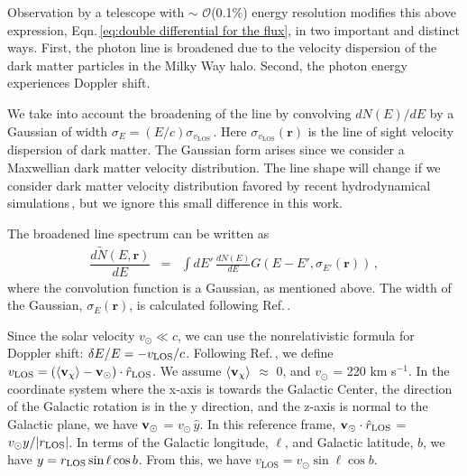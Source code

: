 \documentclass[aps,prd,10pt,twocolumn,superscriptaddress,showpacs,footinbib]{revtex4-1}
\newcommand{\br}[0]{\mathbf{r}}
\newcommand{\los}[0]{\mathrm{LOS}}
\begin{document}
Observation by a telescope with $\sim$ $\mathcal{O}$(0.1\%) energy resolution modifies this above expression, Eqn.\,\ref{eq:double differential for the flux}, in two important and distinct ways.  First, the photon line is broadened due to the velocity dispersion of the dark matter particles in the Milky Way halo.  Second, the photon energy experiences Doppler shift.  

We take into account the broadening of the line by convolving $dN(E)/dE$ by a Gaussian of width
$\sigma_E = (E/c) \sigma_{v_\los}$\,\cite{speckhard2016}.  Here $\sigma_{v_\los}(\br)$ 
is the line of sight velocity dispersion of dark matter.  The Gaussian form arises 
since we consider a Maxwellian dark matter velocity distribution.  The line shape will change if we 
consider dark matter velocity distribution favored by recent hydrodynamical simulations\,\cite{Ling:2009eh,Kuhlen:2013tra,Butsky:2015pya,Bozorgnia:2016ogo,Sloane:2016kyi,Kelso:2016qqj}, 
but we ignore this small difference in this work.  

The broadened line spectrum can be written as 
\begin{eqnarray}
	\dfrac{d \tilde{N} (E, \br)}{dE} &=& \int dE' \, \frac{dN(E)}{dE}  G(E - E', \sigma_{E'} (\br)) \, ,
\label{eq:formula for modified dNdE}
\end{eqnarray}
where the convolution function is a Gaussian, as mentioned above.  The width of the Gaussian,
$\sigma_E(\br)$, is calculated following Ref.\,\cite{speckhard2016}.

Since the solar velocity $v_\odot \ll c$, we can use the nonrelativistic formula for Doppler shift: $\delta
E/E = - v_{\rm LOS}/c$.  Following Ref.\,\cite{speckhard2016}, we define $v_{\rm LOS} = (\langle
{\bf v}_\chi \rangle - {\bf v}_\odot) \cdot \hat{r}_{\rm LOS}$.  We assume $\langle {\bf v}_\chi
\rangle$ $\approx$ 0, and $v_\odot$ = 220 km s$^{-1}$.  In the coordinate system where the x-axis is
towards the Galactic Center, the direction of the Galactic rotation is in the y direction, and the
z-axis is normal to the Galactic plane, we have ${\bf v}_\odot$ = $v_\odot \, \hat{y}$.  In this
reference frame, ${\bf v}_\odot \cdot \hat{r}_{\rm LOS}$ = $v_\odot y / |r_{\rm LOS}|$.  In terms of
the Galactic longitude, $\ell$, and Galactic latitude, $b$, we have $y = r_{\rm LOS} \, {\rm sin} \,
\ell \, {\rm cos} \, b$.  From this, we have $v_\los = v_\odot \sin \ell\cos b$.
\end{document}
